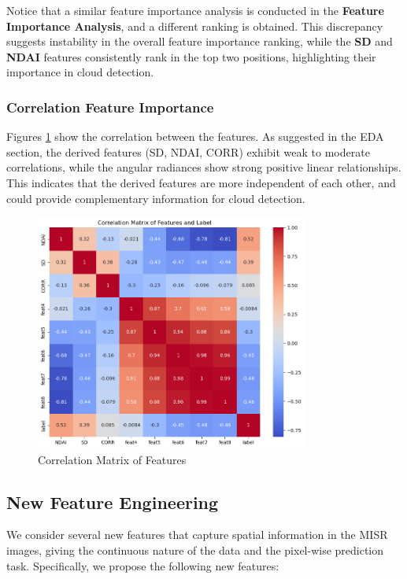 \documentclass[10pt,letterpaper]{article}
\begin{document}
Notice that a similar feature importance analysis is conducted in the \textbf{Feature Importance Analysis}, and a different ranking is obtained. This discrepancy suggests instability in the overall feature importance ranking, while the \textbf{SD} and \textbf{NDAI} features consistently rank in the top two positions, highlighting their importance in cloud detection.

\subsubsection{Correlation Feature Importance}

Figures \ref{fig:feat_corr} show the correlation between the features. As suggested in the EDA section, the derived features (SD, NDAI, CORR) exhibit weak to moderate correlations, while the angular radiances show strong positive linear relationships. This indicates that the derived features are more independent of each other, and could provide complementary information for cloud detection.

\begin{figure}[ht]
    \centering
    \includegraphics[width=0.8\textwidth]{figs/feat_corr.png}
    \caption{Correlation Matrix of Features}
    \label{fig:feat_corr}
\end{figure}

\subsection{New Feature Engineering}

We consider several new features that capture spatial information in the MISR images, giving the continuous nature of the data and the pixel-wise prediction task. Specifically, we propose the following new features:
\end{document}
